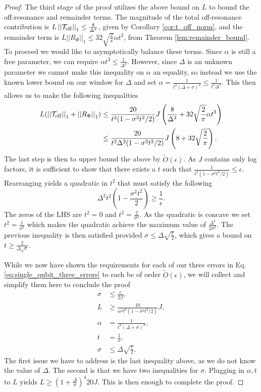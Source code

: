 \documentclass{article}
\newcommand{\off}{\rm off}
\newcommand{\norm}[1]{\left| \left| #1 \right| \right|}
\newcommand{\bigotilde}[1]{\widetilde{O} \left( #1 \right)}
\begin{document}
\begin{proof}
 The third stage of the proof utilizes the above bound on $L$ to bound the  off-resonance and remainder terms. The magnitude of the total off-resonance contribution is $L \norm{\mathcal{T}_{\off}}_1 \le \frac{8 }{\Delta^2}$, given by Corollary \ref{cor:t_off_norm}, and the remainder term is $L \norm{R_{\Phi}}_1 \le 32 \sqrt{\frac{2}{\pi}} \alpha t^3$, from Theorem \ref{lem:remainder_bound}. To proceed we would like to asymptotically balance these terms. Since $\alpha$ is still a free parameter, we can require $\alpha t^3 \le \frac{1}{\Delta^2}$. However, since $\Delta$ is an unknown parameter we cannot make this inequality on $\alpha$ an equality, so instead we use the known lower bound on our window for $\Delta$ and set $\alpha = \frac{1}{t^3(\Delta + \sigma)^2} \le \frac{1}{t^3 \Delta^2}$. This then allows us to make the following inequalities
 \begin{align}
     L(\norm{\mathcal{T}_{\off}}_1 + \norm{R_{\Phi}}_1) &\le \frac{20}{t^2(1 - \sigma^2 t^2 / 2)}J \left( \frac{8}{\Delta^2} + 32 \sqrt{\frac{2}{\pi}} \alpha t^3 \right) \\
    &\le \frac{20}{t^2 \Delta^2 (1 - \sigma^2 t^2 / 2)}J \left( 8 + 32 \sqrt{\frac{2}{\pi}}\right).
 \end{align}
The last step is then to upper bound the above by $\bigotilde{\epsilon}$. As $J$ contains only log factors, it is sufficient to show that there exists a $t$ such that $\frac{1}{t^2(1 - \sigma^2 t^2 / 2)} \le \epsilon$. Rearranging yields a quadratic in $t^2$ that must satisfy the following
\begin{equation}
    \Delta^2 t^2 \left(1 - \frac{\sigma^2 t^2}{2}\right) \ge \frac{1}{\epsilon}.
\end{equation}
The zeros of the LHS are $t^2 = 0$ and $t^2 = \frac{2}{\sigma^2}$. As the quadratic is concave we set $t^2 = \frac{1}{\sigma^2}$ which makes the quadratic achieve the maximum value of $\frac{\Delta^2}{2 \sigma^2}$. The previous inequality is then satisfied provided $\sigma \le \Delta \sqrt{\frac{\epsilon}{2}}$, which gives a bound on $t \ge \frac{2}{\Delta \sqrt{\epsilon}}$.

While we now have shown the requirements for each of our three errors in Eq. \eqref{eq:single_qubit_three_errors} to each be of order $\bigotilde{\epsilon}$, we will collect and simplify them here to conclude the proof
\begin{align}
    \sigma &\le \frac{\epsilon}{2 \beta}, \\
    L &\ge \frac{10}{\alpha^2 t^2(1 - \sigma^2 t^2 / 2)} J, \\
    \alpha &= \frac{1}{t^3(\Delta + \sigma)^2}, \\
    t &= \frac{1}{\sigma}, \\
    \sigma &\le \Delta \sqrt{\frac{\epsilon}{2}}.
\end{align}
The first issue we have to address is the last inequality above, as we do not know the value of $\Delta$. The second is that we have two inequalities for $\sigma$. Plugging in $\alpha, t$ to $L$ yields $ L \ge \left( 1 + \frac{\Delta}{\sigma}\right)^4 20 J$. This is then enough to complete the proof.
 \end{proof}
\end{document}
